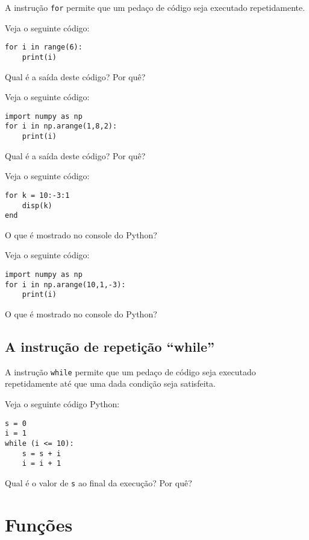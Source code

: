 A instrução \verb+for+ permite que um pedaço de código seja executado repetidamente.

\begin{ex}
  Veja o seguinte código:
\begin{verbatim}
for i in range(6):
    print(i)
\end{verbatim}
Qual é a saída deste código? Por quê?
\end{ex}

\begin{ex}
  Veja o seguinte código:
\begin{verbatim}
import numpy as np
for i in np.arange(1,8,2):
    print(i)
\end{verbatim}
Qual é a saída deste código? Por quê?
\end{ex}

\begin{ex}
  Veja o seguinte código:
\begin{verbatim}
for k = 10:-3:1
    disp(k)
end
\end{verbatim}
O que é mostrado no console do Python?
\end{ex}

\begin{ex}
  Veja o seguinte código:
\begin{verbatim}
import numpy as np
for i in np.arange(10,1,-3):
    print(i)
\end{verbatim}
O que é mostrado no console do Python?
\end{ex}

\subsection{A instrução de repetição ``while''}

A instrução \verb+while+ permite que um pedaço de código seja executado repetidamente até que uma dada condição seja satisfeita.

\begin{ex}
Veja o seguinte código Python:
\begin{verbatim}
s = 0
i = 1
while (i <= 10):
    s = s + i
    i = i + 1
\end{verbatim}
Qual é o valor de \verb+s+ ao final da execução? Por quê?
\end{ex}

\section{Funções}

